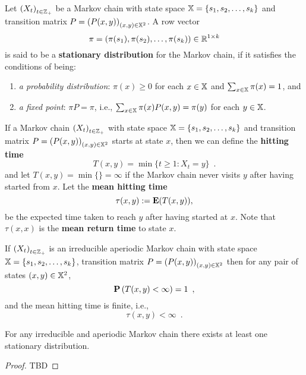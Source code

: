 \begin{definition}
Let $\left( X_t \right)_{t \in \mathbb{Z}_+}$ be a Markov chain with state space $\mathbb{X}=\{s_1,s_2,\ldots,s_k\}$ and transition matrix $P = \left( P(x,y) \right)_{(x,y) \in \mathbb{X}^2}$.  A row vector $$\pi = \left( \pi(s_1), \pi(s_2), \ldots, \pi(s_k) \right) \in \mathbb{R}^{1\times k}$$ is said to be a {\bf stationary distribution} for the Markov chain, if it satisfies the conditions of being:
\begin{enumerate}
\item {\em a probability distribution}: $\pi(x) \geq 0$ for each $x \in \mathbb{X}$ and $\sum_{x \in \mathbb{X}} \pi(x) = 1$, and
\item {\em a fixed point}: $\pi P = \pi$, i.e., $\sum_{x \in \mathbb{X}} \pi(x) P(x,y) = \pi(y)$ for each $y \in \mathbb{X}$.
\end{enumerate}
\end{definition}

\begin{definition}
If a Markov chain $\left( X_t \right)_{t \in \mathbb{Z}_+}$ with state space $\mathbb{X}=\{s_1,s_2,\ldots,s_k\}$ and transition matrix $P = \left( P(x,y) \right)_{(x,y) \in \mathbb{X}^2}$ starts at state $x$, then we can define the {\bf hitting time}
\[
T(x,y) = \min \{ t \geq 1: X_t = y \} \enspace .
\]
and let $T(x,y) = \min \{\} = \infty$ if the Markov chain never visits $y$ after having started from $x$.  Let the {\bf  mean hitting time} 
\[
\tau(x,y) := \mathbf{E}(T(x,y)) ,
\]
be the expected time taken to reach $y$ after having started at $x$.  Note that $\tau(x,x)$ is the {\bf mean return time} to state $x$.
\end{definition}

\begin{prop}  
If  $\left( X_t \right)_{t \in \mathbb{Z}_+}$ is an irreducible aperiodic Markov chain with state space $\mathbb{X}=\{s_1,s_2,\ldots,s_k\}$, transition matrix $P = \left( P(x,y) \right)_{(x,y) \in \mathbb{X}^2}$ then for any pair of states ${(x,y) \in \mathbb{X}^2}$,
\[
\mathbf{P}\left( T(x,y) < \infty \right) = 1 \enspace ,
\]
and the mean hitting time is finite, i.e.,
\[
\tau(x,y) < \infty \enspace .
\]
\end{prop}

\begin{prop}
For any irreducible and aperiodic Markov chain there exists at least one stationary distribution.
\begin{proof}
TBD
\end{proof}
\end{prop}

